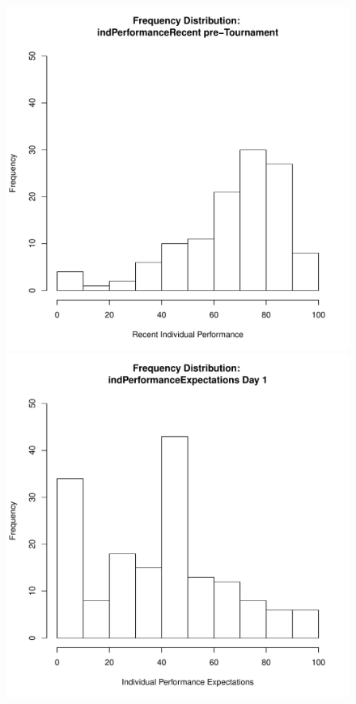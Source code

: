 \documentclass[12pt]{report}
\begin{document}
{%
\begin{figure}[htbp]
  \includegraphics[scale =.4]{../images/distIndPerformancePre.pdf}
  \includegraphics[scale =.4]{../images/distIndPerfExpDay1.pdf}

\end{figure}}
\end{document}
